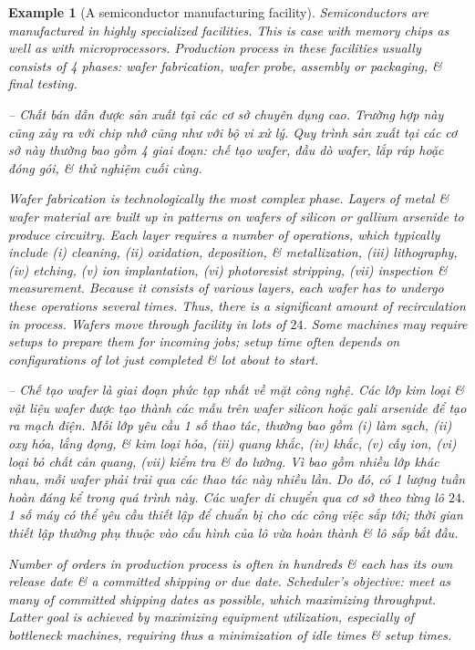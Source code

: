 \documentclass{article}
\newtheorem{example}{Example}
\begin{document}
\begin{itemize}
\begin{itemize}
        \begin{example}[A semiconductor manufacturing facility]
            Semiconductors are manufactured in highly specialized facilities. This is case with memory chips as well as with microprocessors. Production process in these facilities usually consists of 4 phases: wafer fabrication, wafer probe, assembly or packaging, \& final testing.

            -- Chất bán dẫn được sản xuất tại các cơ sở chuyên dụng cao. Trường hợp này cũng xảy ra với chip nhớ cũng như với bộ vi xử lý. Quy trình sản xuất tại các cơ sở này thường bao gồm 4 giai đoạn: chế tạo wafer, đầu dò wafer, lắp ráp hoặc đóng gói, \& thử nghiệm cuối cùng.

            Wafer fabrication is technologically the most complex phase. Layers of metal \& wafer material are built up in patterns on wafers of silicon or gallium arsenide to produce circuitry. Each layer requires a number of operations, which typically include (i) cleaning, (ii) oxidation, deposition, \& metallization, (iii) lithography, (iv) etching, (v) ion implantation, (vi) photoresist stripping, (vii) inspection \& measurement. Because it consists of various layers, each wafer has to undergo these operations several times. Thus, there is a significant amount of recirculation in process. Wafers move through facility in lots of $24$. Some machines may require setups to prepare them for incoming jobs; setup time often depends on configurations of lot just completed \& lot about to start.

            -- Chế tạo wafer là giai đoạn phức tạp nhất về mặt công nghệ. Các lớp kim loại \& vật liệu wafer được tạo thành các mẫu trên wafer silicon hoặc gali arsenide để tạo ra mạch điện. Mỗi lớp yêu cầu 1 số thao tác, thường bao gồm (i) làm sạch, (ii) oxy hóa, lắng đọng, \& kim loại hóa, (iii) quang khắc, (iv) khắc, (v) cấy ion, (vi) loại bỏ chất cản quang, (vii) kiểm tra \& đo lường. Vì bao gồm nhiều lớp khác nhau, mỗi wafer phải trải qua các thao tác này nhiều lần. Do đó, có 1 lượng tuần hoàn đáng kể trong quá trình này. Các wafer di chuyển qua cơ sở theo từng lô $24$. 1 số máy có thể yêu cầu thiết lập để chuẩn bị cho các công việc sắp tới; thời gian thiết lập thường phụ thuộc vào cấu hình của lô vừa hoàn thành \& lô sắp bắt đầu.

            Number of orders in production process is often in hundreds \& each has its own release date \& a committed shipping or due date. Scheduler's objective: meet as many of committed shipping dates as possible, which maximizing throughput. Latter goal is achieved by maximizing equipment utilization, especially of bottleneck machines, requiring thus a minimization of idle times \& setup times.


\end{example}
\end{itemize}
\end{itemize}
\end{document}
